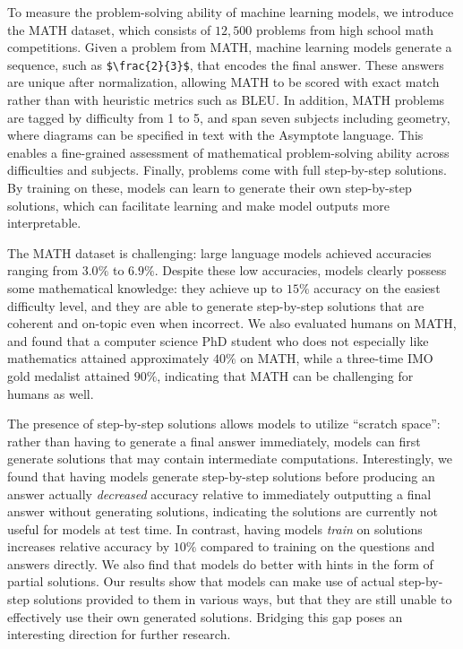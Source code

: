 To measure the problem-solving ability of machine learning models, we introduce the MATH dataset, which consists of $12,500$ problems from high school math competitions. Given a problem from MATH, machine learning models generate a sequence, such as \verb=$\frac{2}{3}$=, that encodes the final answer. These answers are unique after normalization, allowing MATH to be scored with exact match rather than with heuristic metrics such as BLEU. In addition, MATH problems are tagged by difficulty from 1 to 5, and span seven subjects including geometry, where diagrams can be specified in text with the Asymptote language. This enables a fine-grained assessment of mathematical problem-solving ability across difficulties and subjects. Finally, problems come with full step-by-step solutions. By training on these, models can learn to generate their own step-by-step solutions, which can facilitate learning and make model outputs more interpretable.

The MATH dataset is challenging: large language models achieved accuracies ranging from $3.0\%$ to $6.9\%$. Despite these low accuracies, models clearly possess some mathematical knowledge: they achieve up to $15\%$ accuracy on the easiest difficulty level, and they are able to generate step-by-step solutions that are coherent and on-topic even when incorrect. We also evaluated humans on MATH, and found that a computer science PhD student who does not especially like mathematics attained approximately $40\%$ on MATH, while a three-time IMO gold medalist attained $90\%$, indicating that MATH can be challenging for humans as well. 

The presence of step-by-step solutions allows models to utilize ``scratch space'': rather than having to generate a final answer immediately, models can first generate solutions that may contain intermediate computations. Interestingly, we found that having models generate step-by-step solutions before producing an answer actually \emph{decreased} accuracy relative to immediately outputting a final answer without generating solutions, indicating the solutions are currently not useful for models at test time. In contrast, having models \emph{train} on solutions increases relative accuracy by $10\%$ compared to training on the questions and answers directly. We also find that models do better with hints in the form of partial solutions. Our results show that models can make use of actual step-by-step solutions provided to them in various ways, but that they are still unable to effectively use their own generated solutions. Bridging this gap poses an interesting direction for further research.

